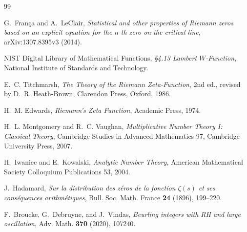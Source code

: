 \documentclass[11pt,reqno]{amsart}
\theoremstyle{definition}
\theoremstyle{remark}
\begin{document}
\begin{thebibliography}{99}

G.~Fran\c{c}a and A.~LeClair,
\emph{Statistical and other properties of Riemann zeros based on an explicit equation for the $n$-th zero on the critical line},
arXiv:1307.8395v3 (2014).

NIST Digital Library of Mathematical Functions,
\emph{\S4.13 Lambert $W$-Function},
National Institute of Standards and Technology.

E.~C. Titchmarsh,
\emph{The Theory of the Riemann Zeta-Function},
2nd ed., revised by D.~R. Heath-Brown,
Clarendon Press, Oxford, 1986.

H.~M. Edwards,
\emph{Riemann's Zeta Function},
Academic Press, 1974.

H.~L. Montgomery and R.~C. Vaughan,
\emph{Multiplicative Number Theory I: Classical Theory},
Cambridge Studies in Advanced Mathematics 97,
Cambridge University Press, 2007.

H.~Iwaniec and E.~Kowalski,
\emph{Analytic Number Theory},
American Mathematical Society Colloquium Publications 53, 2004.

J.~Hadamard,
\emph{Sur la distribution des z\'eros de la fonction $\zeta(s)$ et ses cons\'equences arithm\'etiques},
Bull. Soc. Math. France \textbf{24} (1896), 199--220.

F.~Broucke, G.~Debruyne, and J.~Vindas,
\emph{Beurling integers with RH and large oscillation},
Adv. Math. \textbf{370} (2020), 107240.

\end{thebibliography}
\end{document}
